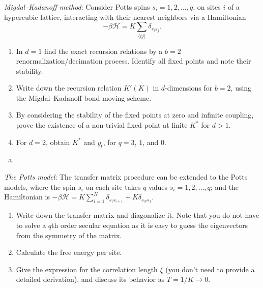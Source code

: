 \begin{problem}
    \textit{Migdal--Kadanoff method}: Consider Potts spins $s_i = 1, 2, \ldots, q$, on sites $i$ of a hypercubic lattice, interacting with their nearest neighbors via a Hamiltonian
    \[
        -\beta\mathcal{H} = K\sum_{\langle ij\rangle}\delta_{s_i s_j}.
    \]

    \begin{enumerate}
        \item[(a)] In $d = 1$ find the exact recursion relations by a $b = 2$ renormalization/decimation process. Identify all fixed points and note their stability.

        \item[(b)] Write down the recursion relation $K'(K)$ in $d$-dimensions for $b = 2$, using the Migdal--Kadanoff bond moving scheme.

        \item[(c)] By considering the stability of the fixed points at zero and infinite coupling, prove the existence of a non-trivial fixed point at finite $K^*$ for $d > 1$.

        \item[(d)] For $d = 2$, obtain $K^*$ and $y_t$, for $q = 3$, $1$, and $0$.
    \end{enumerate}
\end{problem}

\begin{solution}
    \begin{enumerate}[(a)]
        \item
    \end{enumerate}
\end{solution}

\begin{problem}
    \textit{The Potts model}: The transfer matrix procedure can be extended to the Potts models, where the spin $s_i$ on each site takes $q$ values $s_i = 1, 2, \ldots, q$; and the Hamiltonian is $-\beta\mathcal{H} = K\sum_{i=1}^{N}\delta_{s_i s_{i+1}} + K\delta_{s_N s_1}$.

    \begin{enumerate}
        \item[(a)] Write down the transfer matrix and diagonalize it. Note that you do not have to solve a $q$th order secular equation as it is easy to guess the eigenvectors from the symmetry of the matrix.

        \item[(b)] Calculate the free energy per site.

        \item[(c)] Give the expression for the correlation length $\xi$ (you don't need to provide a detailed derivation), and discuss its behavior as $T = 1/K \to 0$.
    \end{enumerate}
\end{problem}

